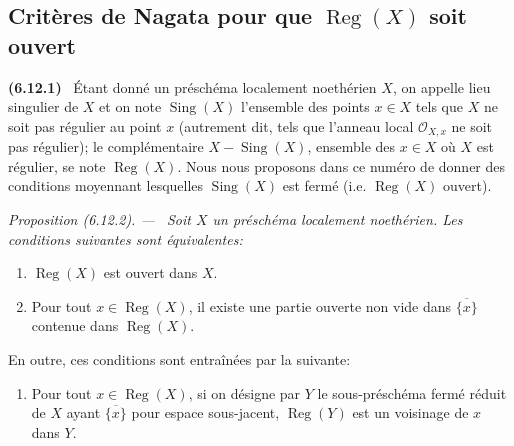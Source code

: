 \documentclass[10pt,oneside]{book}
\newenvironment{env}[1][]{\par\medskip\noindent\textbf{(#1)}\ }{\par}
\newenvironment{proposition}[1][]{%
  \par\medskip\noindent\itshape Proposition (#1). ---\ }{\par}
\begin{document}
\subsection{\texorpdfstring{Critères de Nagata pour que $\operatorname{Reg}(X)$ soit ouvert}{Critères de Nagata pour que Reg(X) soit ouvert}}
\label{IV.2.s6.12-fr}

\begin{env}[6.12.1]
\label{IV.2.s6.12.1-fr}
Étant donné un préschéma localement noethérien $X$, on appelle lieu
singulier de $X$ et on note $\operatorname{Sing}(X)$ l'ensemble des points
$x\in X$ tels que $X$ ne soit pas régulier au point $x$ (autrement dit,
tels que l'anneau local $\mathcal O_{X,x}$ ne soit pas régulier); le
complémentaire $X-\operatorname{Sing}(X)$, ensemble des $x\in X$ où $X$ est
régulier, se note $\operatorname{Reg}(X)$. Nous nous proposons dans ce
numéro de donner des conditions moyennant lesquelles
$\operatorname{Sing}(X)$ est fermé (i.e. $\operatorname{Reg}(X)$ ouvert).
\end{env}

\begin{proposition}[6.12.2]
\label{IV.2.s6.12.2-fr}
Soit $X$ un préschéma localement noethérien. Les conditions suivantes sont
équivalentes:
\begin{enumerate}
\item[a)] $\operatorname{Reg}(X)$ est ouvert dans $X$.
\item[b)] Pour tout $x\in\operatorname{Reg}(X)$, il existe une partie
ouverte non vide dans $\overline{\{x\}}$ contenue dans
$\operatorname{Reg}(X)$.
\end{enumerate}
En outre, ces conditions sont entraînées par la suivante:
\begin{enumerate}
\item[c)] Pour tout $x\in\operatorname{Reg}(X)$, si on désigne par $Y$ le
sous-préschéma fermé réduit de $X$ ayant $\overline{\{x\}}$ pour espace
sous-jacent, $\operatorname{Reg}(Y)$ est un voisinage de $x$ dans $Y$.
\end{enumerate}
\end{proposition}
\end{document}
